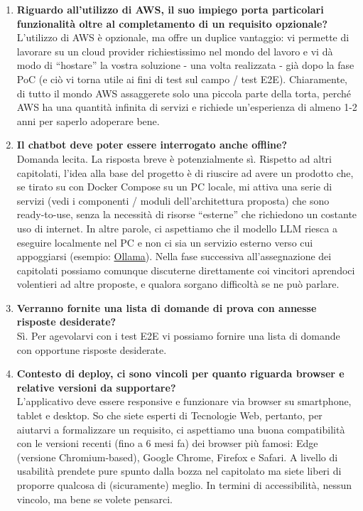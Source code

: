 \begin{enumerate}
    \item \textbf{Riguardo all’utilizzo di AWS, il suo impiego porta particolari funzionalità oltre al completamento di un requisito opzionale?} \\
    L’utilizzo di AWS è opzionale, ma offre un duplice vantaggio: vi permette di lavorare su un cloud provider richiestissimo nel mondo del lavoro e vi dà modo di “hostare” la vostra soluzione - una volta realizzata - già dopo la fase PoC (e ciò vi torna utile ai fini di test sul campo / test E2E). Chiaramente, di tutto il mondo AWS assaggerete solo una piccola parte della torta, perché AWS ha una quantità infinita di servizi e richiede un’esperienza di almeno 1-2 anni per saperlo adoperare bene.

    \item \textbf{Il chatbot deve poter essere interrogato anche offline?} \\
     Domanda lecita. La risposta breve è potenzialmente sì. Rispetto ad altri capitolati, l’idea alla base del progetto è di riuscire ad avere un prodotto che, se tirato su con Docker Compose su un PC locale, mi attiva una serie di servizi (vedi i componenti / moduli dell’architettura proposta) che sono ready-to-use, senza la necessità di risorse “esterne” che richiedono un costante uso di internet. In altre parole, ci aspettiamo che il modello LLM riesca a eseguire localmente nel PC e non ci sia un servizio esterno verso cui appoggiarsi (esempio: \href{https://ollama.com/}{Ollama}). Nella fase successiva all’assegnazione dei capitolati possiamo comunque discuterne direttamente coi vincitori aprendoci volentieri ad altre proposte, e qualora sorgano difficoltà se ne può parlare.

    \item \textbf{Verranno fornite una lista di domande di prova con annesse risposte desiderate?}\\
     Sì. Per agevolarvi con i test E2E vi possiamo fornire una lista di domande con opportune risposte desiderate.

     \item \textbf{Contesto di deploy, ci sono vincoli per quanto riguarda browser e relative versioni da supportare?} \\
    L’applicativo deve essere responsive e funzionare via browser su smartphone, tablet e desktop. So che siete esperti di Tecnologie Web, pertanto, per aiutarvi a formalizzare un requisito, ci aspettiamo una buona compatibilità con le versioni recenti (fino a 6 mesi fa) dei browser più famosi: Edge (versione Chromium-based), Google Chrome, Firefox e Safari. A livello di usabilità prendete pure spunto dalla bozza nel capitolato ma siete liberi di proporre qualcosa di (sicuramente) meglio. In termini di accessibilità, nessun vincolo, ma bene se volete pensarci.


\end{enumerate}
